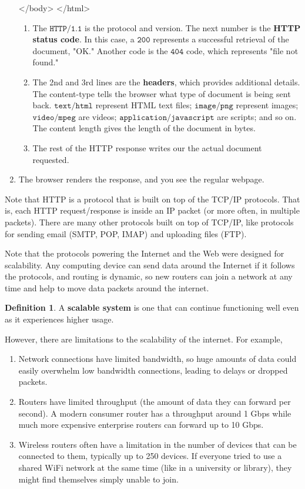\documentclass[a4paper, 12pt]{report}
\theoremstyle{remark}
\theoremstyle{definition}
\newtheorem{definition}{Definition}[section]
\begin{document}
\begin{enumerate}
\begin{python}
        </body>
    </html>
    \end{python}
    \begin{enumerate}
        \item The $\texttt{HTTP/1.1}$ is the protocol and version. The next number is the \textbf{HTTP status code}. In this case, a $\texttt{200}$ represents a successful retrieval of the document, "OK." Another code is the $\texttt{404}$ code, which represents "file not found."
        \item The 2nd and 3rd lines are the \textbf{headers}, which provides additional details. The content-type tells the browser what type of document is being sent back. $\texttt{text/html}$ represent HTML text files; $\texttt{image/png}$ represent images; $\texttt{video/mpeg}$ are videos; $\texttt{application/javascript}$ are scripts; and so on. The content length gives the length of the document in bytes. 
        \item The rest of the HTTP response writes our the actual document requested. 
    \end{enumerate}
    \item The browser renders the response, and you see the regular webpage. 
\end{enumerate}

Note that HTTP is a protocol that is built on top of the TCP/IP protocols. That is, each HTTP request/response is inside an IP packet (or more often, in multiple packets). There are many other protocols built on top of TCP/IP, like protocols for sending email (SMTP, POP, IMAP) and uploading files (FTP). 

Note that the protocols powering the Internet and the Web were designed for scalability. Any computing device can send data around the Internet if it follows the protocols, and routing is dynamic, so new routers can join a network at any time and help to move data packets around the internet.

\begin{definition}
A \textbf{scalable system} is one that can continue functioning well even as it experiences higher usage. 
\end{definition}

However, there are limitations to the scalability of the internet. For example, 
\begin{enumerate}
    \item Network connections have limited bandwidth, so huge amounts of data could easily overwhelm low bandwidth connections, leading to delays or dropped packets. 
    \item Routers have limited throughput (the amount of data they can forward per second). A modern consumer router has a throughput around 1 Gbps while much more expensive enterprise routers can forward up to 10 Gbps. 
    \item Wireless routers often have a limitation in the number of devices that can be connected to them, typically up to 250 devices. If everyone tried to use a shared WiFi network at the same time (like in a university or library), they might find themselves simply unable to join.
\end{enumerate}
\end{document}

